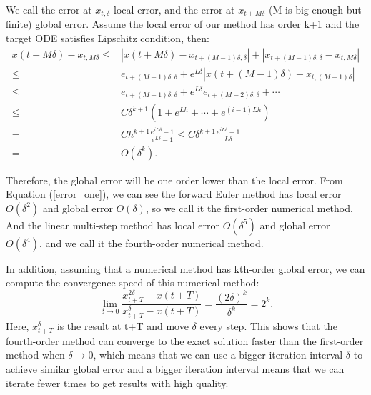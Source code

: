 \documentclass{article}
\begin{document}
We call the error at $x_{t,\delta}$ local error, and the error at $x_{t+M\delta}$ (M is big enough but finite) global error. Assume the local error of our method has order k+1 and the target ODE satisfies Lipschitz condition, then: 
\begin{equation}
   \begin{split}
      x(t+M\delta) - x_{t,M\delta} \leq& |x(t+M\delta) - x_{t+(M-1)\delta, \delta}| + |x_{t+(M-1)\delta, \delta} - x_{t,M\delta}| \\
                                    \leq& e_{t+(M-1)\delta, \delta} + e^{L\delta} |x(t+(M-1)\delta) - x_{t,(M-1)\delta}| \\
                                    \leq& e_{t+(M-1)\delta, \delta} + e^{L\delta} e_{t+(M-2)\delta, \delta} + \cdots \\
                                    \leq& C\delta^{k+1} \left(1+e^{L h}+\cdots+e^{(i-1) L h}\right) \\
                                    =& C h^{k+1} \frac{e^{i L \delta}-1}{e^{L \delta}-1} \leq C \delta^{k+1} \frac{e^{i L \delta}-1}{L\delta} \\
                                    =&O(\delta^k).
   \end{split}
\end{equation}

Therefore, the global error will be one order lower than the local error. From Equation (\ref{error_one}), we can see the forward Euler method has local error $O(\delta^2)$ and global error $O(\delta)$, so we call it the first-order numerical method. And the linear multi-step method has local error $O(\delta^5)$ and global error $O(\delta^4)$, and we call it the fourth-order numerical method.

In addition, assuming that a numerical method has kth-order global error, we can compute the convergence speed of this numerical method:
\begin{equation}
   \lim_{\delta\to 0}\frac{x^{2\delta}_{t+T} - x(t+T)}{x^{\delta}_{t+T} - x(t+T)} = \frac{(2\delta)^k}{\delta^k} = 2^k.
\end{equation}
Here, $x^\delta_{t+T}$ is the result at t+T and move $\delta$ every step. This shows that the fourth-order method can converge to the exact solution faster than the first-order method when $\delta \to 0$, which means that we can use a bigger iteration interval $\delta$ to achieve similar global error and a bigger iteration interval means that we can iterate fewer times to get results with high quality.
\end{document}
